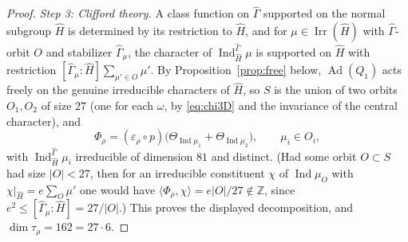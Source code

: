 \documentclass[11pt]{article}
\newcommand{\Z}{\mathbb Z}
\newcommand{\Irr}{\operatorname{Irr}}
\newcommand{\Ind}{\operatorname{Ind}}
\newcommand{\Ad}{\operatorname{Ad}}
\theoremstyle{plain}
\theoremstyle{definition}
\begin{document}
\begin{proof}
\emph{Step 3: Clifford theory.}  A class function on $\hat\Gamma$
supported on the normal subgroup $\hat H$ is determined by its
restriction to $\hat H$, and for $\mu\in\Irr(\hat H)$ with
$\hat\Gamma$-orbit $O$ and stabilizer $\hat\Gamma_\mu$, the character of
$\Ind_{\hat H}^{\hat\Gamma}\mu$ is supported on $\hat H$ with restriction
$[\hat\Gamma_\mu:\hat H]\sum_{\mu'\in O}\mu'$.  By
Proposition~\ref{prop:free} below, $\Ad(Q_1)$ acts freely on the genuine
irreducible characters of $\hat H$, so $S$ is the union of two orbits
$O_1,O_2$ of size $27$ (one for each $\omega$, by \eqref{eq:chi3D} and
the invariance of the central character), and
\[
 \Phi_\rho=(\varepsilon_\rho\circ p)\bigl(\Theta_{\Ind\mu_1}+\Theta_{\Ind\mu_2}\bigr),\qquad \mu_i\in O_i ,
\]
with $\Ind_{\hat H}^{\hat\Gamma}\mu_i$ irreducible of dimension $81$ and
distinct.  (Had some orbit $O\subset S$ had size $|O|<27$, then for an
irreducible constituent $\chi$ of $\Ind\mu_O$ with
$\chi|_{\hat H}=e\sum_O\mu'$ one would have
$\langle\Phi_\rho,\chi\rangle=e|O|/27\notin\Z$, since
$e^2\le[\hat\Gamma_\mu:\hat H]=27/|O|$.)  This proves the displayed
decomposition, and $\dim\tau_\rho=162=27\cdot6$.
\end{proof}
\end{document}
